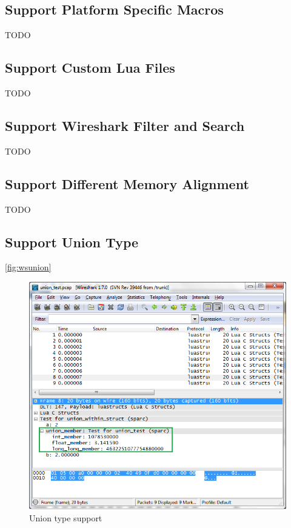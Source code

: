 \subsection{Support Platform Specific Macros}
TODO

\subsection{Support Custom Lua Files}
TODO

\subsection{Support Wireshark Filter and Search}
TODO

\subsection{Support Different Memory Alignment}
TODO

\subsection{Support Union Type}
\autoref{fig:wsunion}

\begin{figure}[ht]
	\center
	\includegraphics[width=\textwidth]{./sprints/img/wireshark_union}
	\caption{Union type support\label{fig:wsunion}}
\end{figure}

